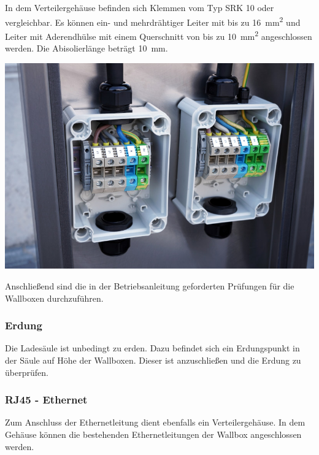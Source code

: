 \documentclass[a4paper,10pt]{article}
\begin{document}
\begin{multicols*}{2}
	In dem Verteilergehäuse befinden sich Klemmen vom Typ SRK 10
	oder vergleichbar. Es können ein- und mehrdrähtiger Leiter mit bis zu
	\SI{16}{\square\milli\meter} und Leiter mit Aderendhülse mit einem
	Querschnitt von bis zu \SI{10}{\square\milli\meter} angeschlossen werden.
	Die Abisolierlänge beträgt \SI{10}{\milli\meter}.


	\begin{center}
		\includegraphics[width=\linewidth]{./img/warp-charger-stand-clamps}
	\end{center}

	Anschließend sind die in der Betriebsanleitung geforderten Prüfungen für die
	Wallboxen durchzuführen.

	\subsubsection{Erdung}
	Die Ladesäule ist unbedingt zu erden. Dazu befindet sich ein Erdungspunkt in
	der Säule auf Höhe der Wallboxen. Dieser ist anzuschließen und die Erdung zu
	überprüfen.

	\subsubsection{RJ45 - Ethernet}
	Zum Anschluss der Ethernetleitung dient ebenfalls ein Verteilergehäuse.
	In dem Gehäuse können die bestehenden Ethernetleitungen der Wallbox
	angeschlossen werden.


\end{multicols*}
\end{document}
